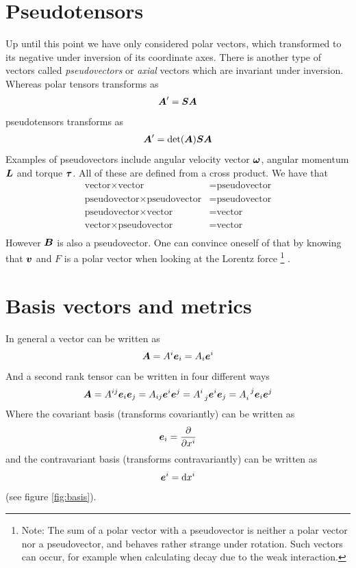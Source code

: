 \documentclass[a4paper, 12pt]{article}
\begin{document}
\section{Pseudotensors}
Up until this point we have only considered polar vectors, which transformed to 
its negative under inversion of its coordinate axes. There is another type of 
vectors called \emph{pseudovectors} or \emph{axial} vectors which are invariant 
under inversion. Whereas polar tensors transforms as
%
\begin{align*}
 \boldsymbol{A}' = \boldsymbol{S}\boldsymbol{A}
\end{align*}
%
pseudotensors transforms as
%
\begin{align*}
 \boldsymbol{A}' = \det(\boldsymbol{A})\boldsymbol{S}\boldsymbol{A}
\end{align*}
%
Examples of pseudovectors include angular velocity vector $\boldsymbol{\omega}$, 
angular momentum $\boldsymbol{L}$ and torque $\boldsymbol{\tau}$. All of these are defined 
from a cross product. We have that
%
\begin{align*}
 \text{vector} \times \text{vector} &= \text{pseudovector}\\
 \text{pseudovector} \times \text{pseudovector} &= \text{pseudovector}\\
 \text{pseudovector} \times \text{vector} &= \text{vector}\\
 \text{vector} \times \text{pseudovector} &= \text{vector}\\
\end{align*}
%
However $\boldsymbol{B}$ is also a pseudovector. One can convince oneself of that by 
knowing that $\boldsymbol{v}$ and $F$ is a polar vector when looking at the Lorentz 
force%
\footnote{Note: The sum of a polar vector with a pseudovector is neither a 
polar vector nor a pseudovector, and behaves rather strange under rotation. 
Such vectors can occur, for example when calculating decay due to the weak 
interaction.}%
.




\section{Basis vectors and metrics}
In general a vector can be written as
%
\begin{align*}
 \boldsymbol{A} = A^i\boldsymbol{e}_i = A_i\boldsymbol{e}^i
\end{align*}
%
And a second rank tensor can be written in four different ways
%
\begin{align*}
 \boldsymbol{A} = 
 A^{ij}\boldsymbol{e}_i\boldsymbol{e}_j =
 A_{ij}\boldsymbol{e}^i\boldsymbol{e}^j =
 A^{i}_{\;\;j}\boldsymbol{e}^i\boldsymbol{e}_j =
 A_{i}^{\;\;j}\boldsymbol{e}_i\boldsymbol{e}^j
\end{align*}
%
Where the covariant basis (transforms covariantly) can be written as
%
\begin{align}
 \boldsymbol{e}_i = \frac{\partial {}}{\partial{x^i}} \label{eq:cov_basis}
\end{align}
%
and the contravariant basis (transforms contravariantly) can be written as
%
\begin{align}
 \boldsymbol{e}^i = \text{d}x^i \label{eq:con_basis}
\end{align}
%
(see figure \ref{fig:basis}).
\end{document}
